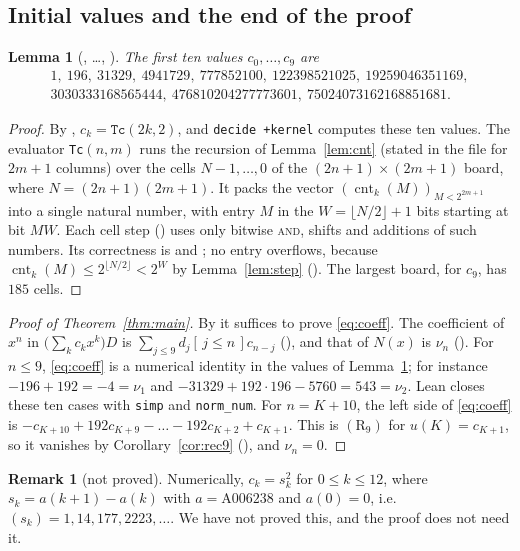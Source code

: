 \documentclass[11pt]{amsart}
\theoremstyle{plain}
\newtheorem{lemma}[theorem]{Lemma}
\theoremstyle{definition}
\newtheorem{remark}[theorem]{Remark}
\newcommand{\ib}[1]{[\,#1\,]}
\newcommand{\cnt}{\operatorname{cnt}}
\begin{document}
\subsection{Initial values and the end of the proof}

\begin{lemma}[, \dots, ]\label{lem:init}
The first ten values $c_0,\dots,c_9$ are
\[
\begin{gathered}
1,\ 196,\ 31329,\ 4941729,\ 777852100,\ 122398521025,\ 19259046351169,\\ 3030333168565444,\ 476810204277773601,\ 75024073162168851681.
\end{gathered}
\]
\end{lemma}

\begin{proof}
By , $c_k=\texttt{Tc}(2k,2)$, and \texttt{decide +kernel} computes these ten values. The evaluator \texttt{Tc}$(n,m)$ runs the recursion of Lemma~\ref{lem:cnt} (stated in the file for $2m+1$ columns) over the cells $N-1,\dots,0$ of the $(2n+1)\times(2m+1)$ board, where $N=(2n+1)(2m+1)$. It packs the vector $(\cnt_k(M))_{M<2^{2m+1}}$ into a single natural number, with entry $M$ in the $W=\lfloor N/2\rfloor+1$ bits starting at bit $MW$. Each cell step () uses only bitwise \textsc{and}, shifts and additions of such numbers. Its correctness is  and ; no entry overflows, because $\cnt_k(M)\le2^{\lfloor N/2\rfloor}<2^W$ by Lemma~\ref{lem:step} (). The largest board, for $c_9$, has $185$ cells.
\end{proof}

\begin{proof}[Proof of Theorem~\ref{thm:main}]
By  it suffices to prove \eqref{eq:coeff}. The coefficient of $x^n$ in $\bigl(\sum_kc_kx^k\bigr)D$ is $\sum_{j\le9}d_j\ib{j\le n}c_{n-j}$ (), and that of $N(x)$ is $\nu_n$ (). For $n\le9$, \eqref{eq:coeff} is a numerical identity in the values of Lemma~\ref{lem:init}; for instance $-196+192=-4=\nu_1$ and $-31329+192\cdot196-5760=543=\nu_2$. Lean closes these ten cases with \texttt{simp} and \texttt{norm\_num}. For $n=K+10$, the left side of \eqref{eq:coeff} is $-c_{K+10}+192c_{K+9}-\dots-192c_{K+2}+c_{K+1}$. This is $(\mathrm{R}_9)$ for $u(K)=c_{K+1}$, so it vanishes by Corollary~\ref{cor:rec9} (), and $\nu_n=0$.
\end{proof}

\begin{remark}[not proved]
Numerically, $c_k=s_k^2$ for $0\le k\le12$, where $s_k=a(k+1)-a(k)$ with $a=\mathrm{A006238}$ \cite{A006238} and $a(0)=0$, i.e.\ $(s_k)=1,14,177,2223,\dots$. We have not proved this, and the proof does not need it.
\end{remark}
\end{document}
